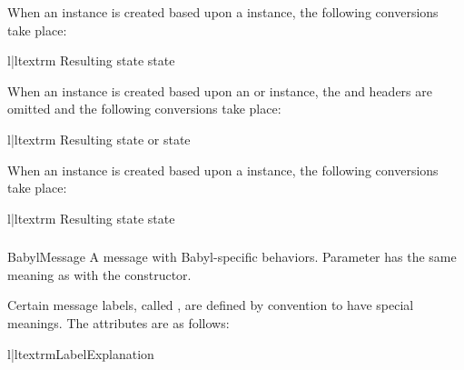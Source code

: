 When an  instance is created based upon a
 instance, the following conversions take place:

\begin{tableii}{l|l}{textrm}
    {Resulting state}{ state}
\end{tableii}

When an  instance is created based upon an 
or  instance, the  and
 headers are omitted and the following conversions take
place:

\begin{tableii}{l|l}{textrm}
    {Resulting state}{ or  state}
\end{tableii}

When an  instance is created based upon a 
instance, the following conversions take place:

\begin{tableii}{l|l}{textrm}
    {Resulting state}{ state}
\end{tableii}

\subsubsection{}
\label{mailbox-babylmessage}

\begin{classdesc}{BabylMessage}{}
A message with Babyl-specific behaviors. Parameter  has the same
meaning as with the  constructor.
\end{classdesc}

Certain message labels, called , are defined by convention to
have special meanings. The attributes are as follows:

\begin{tableii}{l|l}{textrm}{Label}{Explanation}
\end{tableii}

